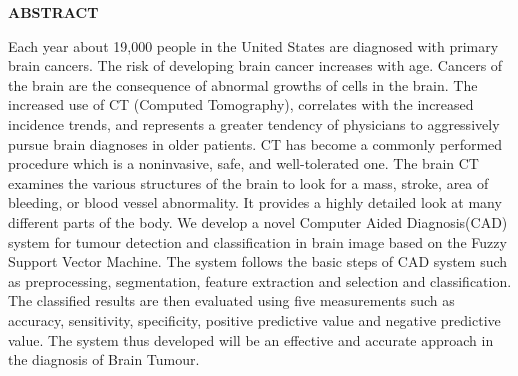 \newpage
\vspace{2cm}

\begin{center}
\large \textbf{ABSTRACT}
\end{center}

\vspace{0.5cm}


Each year about 19,000 people in the United States are diagnosed with primary brain cancers. The risk of developing brain cancer increases with age. Cancers of the brain are the consequence of abnormal growths of cells in the brain.  The increased use of CT (Computed Tomography), correlates with the increased incidence trends, and represents a greater tendency of physicians to aggressively pursue brain diagnoses in older patients. CT has become a commonly performed procedure which is a noninvasive, safe, and well-tolerated one. The brain CT examines the various structures of the brain to look for a mass, stroke, area of bleeding, or blood vessel abnormality. It provides a highly detailed look at many different parts of the body.  We develop a novel Computer Aided Diagnosis(CAD) system for tumour detection and classification in brain image based on the Fuzzy Support Vector Machine. The system follows the basic steps of CAD system such as preprocessing, segmentation, feature extraction and selection and classification. The classified results are then evaluated using five measurements such as accuracy, sensitivity, specificity, positive predictive value and negative predictive value. The system thus developed will be an effective and accurate approach in the diagnosis of Brain Tumour. 
